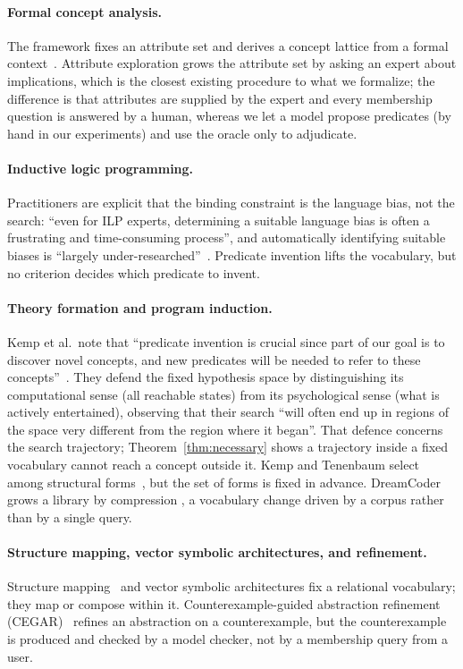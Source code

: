 \documentclass[11pt]{article}
\begin{document}
\paragraph{Formal concept analysis.} The framework fixes an attribute set and derives a concept lattice
from a formal context~\cite{ganter1999}. Attribute exploration grows the attribute set by
asking an expert about implications, which is the closest existing procedure to what we
formalize; the difference is that attributes are supplied by the expert and every membership
question is answered by a human, whereas we let a model propose predicates (by hand in our
experiments) and use the oracle only to adjudicate.

\paragraph{Inductive logic programming.} Practitioners are explicit that the binding
constraint is the language bias, not the search: ``even for ILP experts, determining a suitable
language bias is often a frustrating and time-consuming process'', and automatically
identifying suitable biases is ``largely under-researched''~\cite{cropper2021}. Predicate
invention lifts the vocabulary, but no criterion decides which predicate to invent.

\paragraph{Theory formation and program induction.} Kemp et al.\ note that ``predicate
invention is crucial since part of our goal is to discover novel concepts, and new predicates
will be needed to refer to these concepts''~\cite{kemp2010}. They defend the fixed hypothesis
space by distinguishing its computational sense (all reachable states) from its psychological
sense (what is actively entertained), observing that their search ``will often end up in
regions of the space very different from the region where it began''. That defence concerns the
search trajectory; Theorem~\ref{thm:necessary} shows a trajectory inside a fixed vocabulary
cannot reach a concept outside it. Kemp and Tenenbaum select among structural forms~\cite{kemp2008}, but the set of forms is fixed in advance. DreamCoder grows a library by compression
\cite{ellis2020}, a vocabulary change driven by a corpus rather than by a single query.

\paragraph{Structure mapping, vector symbolic architectures, and refinement.} Structure mapping~\cite{falkenhainer1989}
and vector symbolic architectures fix a relational vocabulary; they map or compose within it.
Counterexample-guided abstraction refinement (CEGAR)~\cite{clarke2000} refines an abstraction on a counterexample, but the counterexample is
produced and checked by a model checker, not by a membership query from a user.
\end{document}

